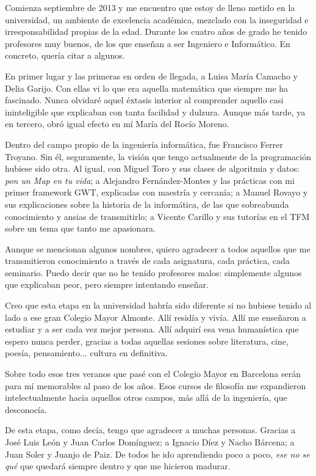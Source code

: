Comienza septiembre de 2013 y me encuentro que estoy de lleno metido en la universidad, un ambiente de excelencia académica, mezclado con la inseguridad e irresponsabilidad propias de la edad. Durante los cuatro años de grado he tenido profesores muy buenos, de los que enseñan a ser Ingeniero e Informático. En concreto, quería citar a algunos.

En primer lugar y las primeras en orden de llegada, a Luisa María Camacho y Delia Garijo. Con ellas vi lo que era aquella matemática que siempre me ha fascinado. Nunca olvidaré aquel éxtasis interior al comprender aquello casi ininteligible que explicaban con tanta facilidad y dulzura. Aunque más tarde, ya en tercero, obró igual efecto en mí María del Rocío Moreno.

Dentro del campo propio de la ingeniería informática, fue Francisco Ferrer Troyano. Sin él, seguramente, la visión que tengo actualmente de la programación hubiese sido otra. Al igual, con Miguel Toro y sus clases de algoritmia y datos: \textit{pon un Map en tu vida}; a Alejandro Fernández-Montes y las prácticas con mi primer framework GWT, explicadas con maestría y cercanía; a Manuel Rovayo y sus explicaciones sobre la historia de la informática, de las que sobreabunda conocimiento y ansias de transmitirlo; a Vicente Carillo y sus tutorías en el TFM sobre un tema que tanto me apasionara.

Aunque se mencionan algunos nombres, quiero agradecer a todos aquellos que me transmitieron conocimiento a través de cada asignatura, cada práctica, cada seminario. Puedo decir que no he tenido profesores malos: simplemente algunos que explicaban peor, pero siempre intentando enseñar.

Creo que esta etapa en la universidad habría sido diferente si no hubiese tenido al lado a ese gran Colegio Mayor Almonte. Allí residía y vivía. Allí me enseñaron a estudiar y a ser cada vez mejor persona. Allí adquirí esa vena humanística que espero nunca perder, gracias a todas aquellas sesiones sobre literatura, cine, poesía, pensamiento... cultura en definitiva.

Sobre todo esos tres veranos que pasé con el Colegio Mayor en Barcelona serán para mí memorables al paso de los años. Esos cursos de filosofía me expandieron intelectualmente hacia aquellos otros campos, más allá de la ingeniería, que desconocía.

De esta etapa, como decía, tengo que agradecer a muchas personas. Gracias a José Luis León y Juan Carlos Domínguez; a Ignacio Díez y Nacho Bárcena; a Juan Soler y Juanjo de Paiz. De todos he ido aprendiendo poco a poco, \textit{ese no se qué} que quedará siempre dentro y que me hicieron madurar.

